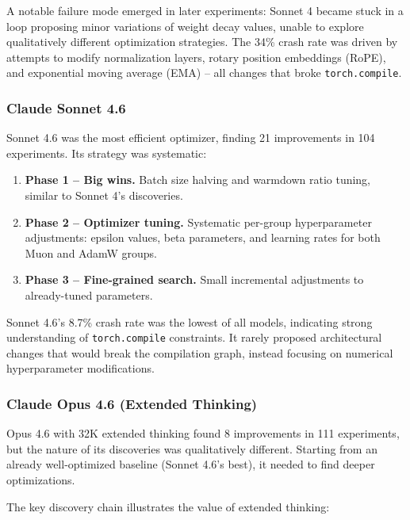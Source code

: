 \documentclass[11pt]{article}
\begin{document}
A notable failure mode emerged in later experiments: Sonnet 4 became stuck in a loop proposing minor variations of weight decay values, unable to explore qualitatively different optimization strategies. The 34\% crash rate was driven by attempts to modify normalization layers, rotary position embeddings (RoPE), and exponential moving average (EMA) -- all changes that broke \texttt{torch.compile}.

\subsubsection{Claude Sonnet 4.6}

Sonnet 4.6 was the most efficient optimizer, finding 21 improvements in 104 experiments. Its strategy was systematic:

\begin{enumerate}[leftmargin=*]
    \item \textbf{Phase 1 -- Big wins.} Batch size halving and warmdown ratio tuning, similar to Sonnet 4's discoveries.
    \item \textbf{Phase 2 -- Optimizer tuning.} Systematic per-group hyperparameter adjustments: epsilon values, beta parameters, and learning rates for both Muon and AdamW groups.
    \item \textbf{Phase 3 -- Fine-grained search.} Small incremental adjustments to already-tuned parameters.
\end{enumerate}

Sonnet 4.6's 8.7\% crash rate was the lowest of all models, indicating strong understanding of \texttt{torch.compile} constraints. It rarely proposed architectural changes that would break the compilation graph, instead focusing on numerical hyperparameter modifications.

\subsubsection{Claude Opus 4.6 (Extended Thinking)}

Opus 4.6 with 32K extended thinking found 8 improvements in 111 experiments, but the nature of its discoveries was qualitatively different. Starting from an already well-optimized baseline (Sonnet 4.6's best), it needed to find deeper optimizations.

The key discovery chain illustrates the value of extended thinking:
\end{document}
